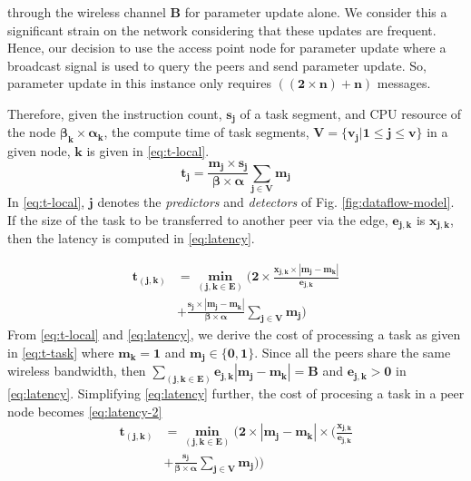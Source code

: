 through the wireless channel $ \bm{B} $ for parameter update 
alone. We consider this a significant strain on the network 
considering that these updates are frequent. Hence, our 
decision to use the access point node for parameter update 
where a broadcast signal is used to query the peers and send 
parameter update. So, parameter update in this 
instance only requires $ {\bm{((2\times n) + n)}} $ messages. 
\par 
Therefore, given the instruction count, $ \bm{s_j} $ of a 
task 
segment, and CPU resource of the node $ \bm{\beta_k 
\times \alpha_k} $, the compute time of task segments, ${ 
\bm{V=\{v_j|1\leq j \leq v\}}} $ in a given node, $ \bm{k} $ 
is given in \eqref{eq:t-local}.
\begin{equation}
	\bm{t_{j}=\frac{m_j\times 
	s_j}{\beta\times\alpha}\sum_{j\in 
	V}m_j}
	\label{eq:t-local}
\end{equation}
In \eqref{eq:t-local}, $ \bm{j} $ denotes the 
\emph{predictors} and \emph{detectors} of Fig. 
\ref{fig:dataflow-model}. If the size of the task to be 
transferred to another peer via the edge, $ \bm{e_{j,k}} $ is 
$ \bm{x_{j,k}} $, then the latency is computed in 
\eqref{eq:latency}.

\begin{equation}
\begin{split}
\bm{t_{(j,k)}} &= \bm{\min_{(j,k\in E)}( 2 
\times\frac{x_{j,k}\times|m_j-m_k|}{e_{j,k}}}\\
	&\bm{+\frac{s_j\times|m_j-m_k|}{\beta\times\alpha}\sum_{j\in
		V}m_j)}
\label{eq:latency}
\end{split}
\end{equation}
From \eqref{eq:t-local} and \eqref{eq:latency}, we derive the 
cost of processing a task as given in \eqref{eq:t-task} where 
$ \bm{m_k=1} $ and $ \bm{m_j \in \{0,1\}} $. Since all the 
peers share the same wireless bandwidth, then $ 
{\bm{\sum_{(j,k\in E)}e_{j,k}|m_j-m_k|=B}} $ and $ 
{\bm{e_{j,k}>0}} $ in \eqref{eq:latency}. Simplifying 
\eqref{eq:latency} further, the cost of procesing a task in a 
peer node becomes \eqref{eq:latency-2}
\begin{equation}
\begin{split}
\bm{t_{(j,k)}} &= \bm{\min_{(j,k\in E)}( 2 
	\times |m_j-m_k|\times(\frac{x_{j,k}}{e_{j,k}}}\\
&\bm{+\frac{s_j}{\beta\times\alpha}\sum_{j\in
		V}m_j))}
\label{eq:latency-2}
\end{split}
\end{equation}

